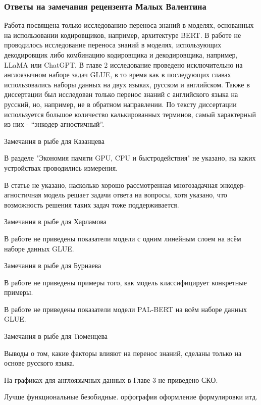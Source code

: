 \begin{frame}
    \frametitle{Ответы на замечания рецензента Малых Валентина}
    \begin{itemize}
Работа посвящена только исследованию переноса знаний в моделях, основанных на использовании кодировщиков, например, архитектуре BERT. В работе не проводилось исследование переноса знаний в моделях, использующих декодировщик либо комбинацию кодировщика и декодировщика, например, LLaMA или ChatGPT.
В главе 2 исследование проведено исключительно на англоязычном наборе задач GLUE, в то время как в последующих главах использовались наборы данных на двух языках, русском и английском. 
Также в диссертации был исследован только перенос знаний с английского языка на русский, но, например, не в обратном направлении.
По тексту диссертации используется большое количество калькированных терминов, самый характерный из них - “энкодер-агностичный”. 
    \end{itemize}
\end{frame}

Замечания в рыбе для Казанцева

В разделе "Экономия памяти GPU, CPU и быстродействия" не указано, на каких устройствах проводились измерения.

В статье не указано, насколько хорошо рассмотренная многозадачная энкодер-агностичная модель решает задачи ответа на вопросы, хотя указано, что возможность решения таких задач тоже поддерживается.

Замечания в рыбе для Харламова

В работе не приведены показатели модели с одним линейным слоем на всём наборе данных GLUE.

Замечания в рыбе для Бурнаева

В работе не приведены примеры того, как модель классифицирует конкретные примеры.

В работе не приведены показатели модели PAL-BERT на всём наборе данных GLUE.

Замечания в рыбе для Тюменцева

Выводы о том, какие факторы влияют на перенос знаний, сделаны только на основе русского языка.

На графиках для англоязычных данных в Главе 3 не приведено СКО.

\fi

Лучше функциональные безобидные. орфография оформление формулировки итд.